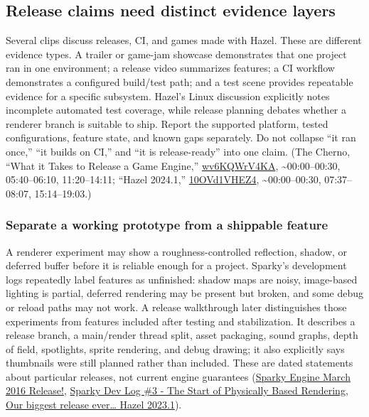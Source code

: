 \subsection{Release claims need distinct evidence layers}\label{06-engine-ii-ch041-release-claims-need-distinct-evidence-layers}

Several clips discuss releases, CI, and games made with Hazel. These are different evidence types. A trailer or game-jam showcase demonstrates that one project ran in one environment; a release video summarizes features; a CI workflow demonstrates a configured build/test path; and a test scene provides repeatable evidence for a specific subsystem. Hazel's Linux discussion explicitly notes incomplete automated test coverage, while release planning debates whether a renderer branch is suitable to ship. Report the supported platform, tested configurations, feature state, and known gaps separately. Do not collapse ``it ran once,'' ``it builds on CI,'' and ``it is release-ready'' into one claim. (The Cherno, ``What it Takes to Release a Game Engine,'' \href{https://www.youtube.com/watch?v=wv6KQWrV4KA}{wv6KQWrV4KA}, \textasciitilde00:00--00:30, 05:40--06:10, 11:20--14:11; ``Hazel 2024.1,'' \href{https://www.youtube.com/watch?v=10OVd1VHEZ4}{10OVd1VHEZ4}, \textasciitilde00:00--00:30, 07:37--08:07, 15:14--19:03.)

\subsubsection{Separate a working prototype from a shippable feature}\label{06-engine-ii-ch041-separate-a-working-prototype-from-a-shippable-feature}

A renderer experiment may show a roughness-controlled reflection, shadow, or deferred buffer before it is reliable enough for a project. Sparky's development logs repeatedly label features as unfinished: shadow maps are noisy, image-based lighting is partial, deferred rendering may be present but broken, and some debug or reload paths may not work. A release walkthrough later distinguishes those experiments from features included after testing and stabilization. It describes a release branch, a main/render thread split, asset packaging, sound graphs, depth of field, spotlights, sprite rendering, and debug drawing; it also explicitly says thumbnails were still planned rather than included. These are dated statements about particular releases, not current engine guarantees (\href{https://www.youtube.com/watch?v=o4_tPhgslcU&t=4m34s}{Sparky Engine March 2016 Release!}, \href{https://www.youtube.com/watch?v=YRd2F1JDGlg&t=0m8s}{Sparky Dev Log \#3 - The Start of Physically Based Rendering}, \href{https://www.youtube.com/watch?v=L_XLGmG2Ct8&t=0m1s}{Our biggest release ever\ldots{} Hazel 2023.1}).

